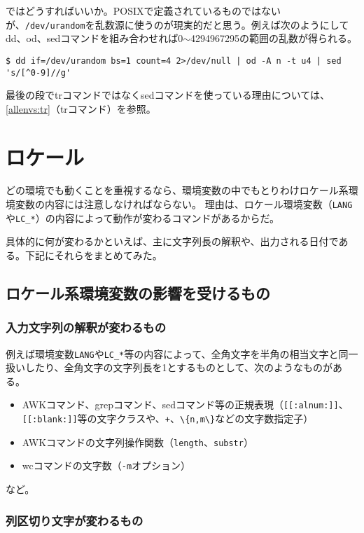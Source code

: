 ではどうすればいいか。POSIXで定義されているものではないが、\verb|/dev/urandom|を乱数源に使うのが現実的だと思う。例えば次のようにしてdd、od、sedコマンドを組み合わせれば0$\sim$4294967295の範囲の乱数が得られる。

\begin{screen}
	\verb!$ dd if=/dev/urandom bs=1 count=4 2>/dev/null | od -A n -t u4 | sed 's/[^0-9]//g'! \return
\end{screen}

最後の段でtrコマンドではなくsedコマンドを使っている理由については、\ref{allenvs:tr}（trコマンド）を参照。

\section{ロケール}
\label{allenvs:locale}

どの環境でも動くことを重視するなら、環境変数の中でもとりわけロケール系環境変数の内容には注意しなければならない。
理由は、ロケール環境変数（\verb|LANG|や\verb|LC_*|）の内容によって動作が変わるコマンドがあるからだ。

具体的に何が変わるかといえば、主に文字列長の解釈や、出力される日付である。下記にそれらをまとめてみた。

\subsection*{ロケール系環境変数の影響を受けるもの}

\subsubsection*{入力文字列の解釈が変わるもの}

例えば環境変数\verb|LANG|や\verb|LC_*|等の内容によって、全角文字を半角の相当文字と同一扱いしたり、全角文字の文字列長を1とするものとして、次のようなものがある。

\begin{itemize}
  \item AWKコマンド、grepコマンド、sedコマンド等の正規表現（\verb|[[:alnum:]]|、\verb|[[:blank:]]|等の文字クラスや、\verb|+|、\verb|\{n,m\}|などの文字数指定子）
  \item AWKコマンドの文字列操作関数（\verb|length|、\verb|substr|）
  \item wcコマンドの文字数（\verb|-m|オプション）
\end{itemize}

\noindent
など。

\subsubsection*{列区切り文字が変わるもの}

